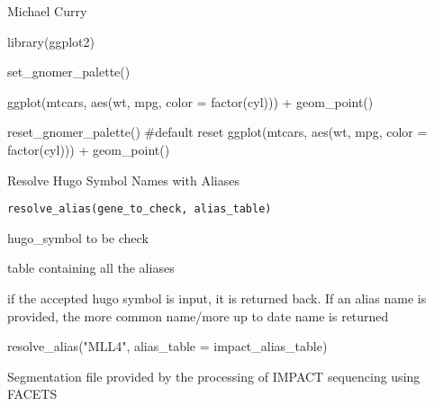 \documentclass[a4paper]{book}
\begin{document}
%
\begin{Author}\relax
Michael Curry
\end{Author}
%
\begin{Examples}
\begin{ExampleCode}
library(ggplot2)

set_gnomer_palette()

ggplot(mtcars, aes(wt, mpg, color = factor(cyl))) +
  geom_point()

reset_gnomer_palette()
#default reset
ggplot(mtcars, aes(wt, mpg, color = factor(cyl))) +
  geom_point()

\end{ExampleCode}
\end{Examples}
%
\begin{Description}\relax
Resolve Hugo Symbol Names with Aliases
\end{Description}
%
\begin{Usage}
\begin{verbatim}
resolve_alias(gene_to_check, alias_table)
\end{verbatim}
\end{Usage}
%
\begin{Arguments}
\begin{ldescription}
\item[\code{gene\_to\_check}] hugo\_symbol to be check

\item[\code{alias\_table}] table containing all the aliases
\end{ldescription}
\end{Arguments}
%
\begin{Value}
if the accepted hugo symbol is input, it is returned back.
If an alias name is provided, the more common name/more up to date name is returned
\end{Value}
%
\begin{Examples}
\begin{ExampleCode}
resolve_alias("MLL4", alias_table = impact_alias_table)

\end{ExampleCode}
\end{Examples}
%
\begin{Description}\relax
Segmentation file provided by the processing of IMPACT sequencing using FACETS
\end{Description}
\end{document}

